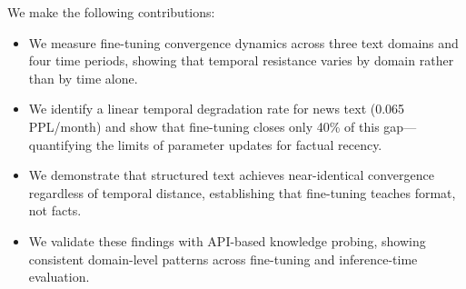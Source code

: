 We make the following contributions:
\begin{itemize}[leftmargin=*,itemsep=0pt,topsep=0pt]
    \item We measure fine-tuning convergence dynamics across three text domains and four time periods, showing that temporal resistance varies by domain rather than by time alone.
    \item We identify a linear temporal degradation rate for news text (0.065 PPL/month) and show that fine-tuning closes only 40\% of this gap---quantifying the limits of parameter updates for factual recency.
    \item We demonstrate that structured text achieves near-identical convergence regardless of temporal distance, establishing that fine-tuning teaches format, not facts.
    \item We validate these findings with API-based knowledge probing, showing consistent domain-level patterns across fine-tuning and inference-time evaluation.
\end{itemize}
